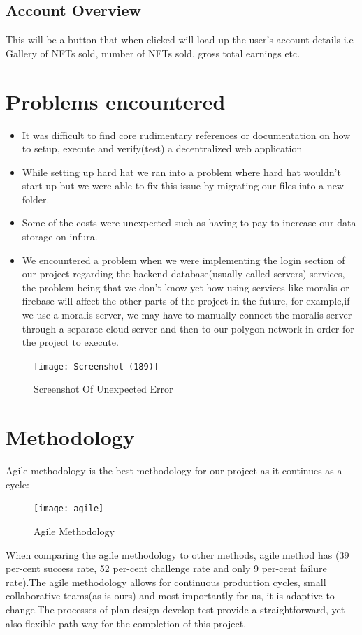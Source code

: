\documentclass[a4paper,12pt]{article}
\begin{document}
\subsection{Account Overview}
This will be a button that when clicked will load up the user's account details i.e Gallery of NFTs sold, number of NFTs sold, gross total earnings etc.


\section{Problems encountered}
\begin{itemize}
\item It was difficult to find core rudimentary references or documentation on how to setup, execute and verify(test) a decentralized web application
\item While setting up hard hat we ran into a problem where hard hat wouldn't start up but we were able to fix this issue by migrating our files into a new folder.
\item Some of the  costs were unexpected such as having to pay to increase our data storage on infura.
\item We encountered a problem when we were implementing the login section of our project regarding the backend database(usually called servers) services, the problem being that we don't know yet how using services like moralis or firebase will affect the other parts of the project in the future, for example,if we use a moralis server, we may have to manually connect the moralis server through a separate cloud server and then to our polygon network in order for the project to execute.

\end{itemize}
\begin{figure}[h]
\centering
\texttt{[image: Screenshot (189)]}
\caption{Screenshot Of Unexpected Error}
\end{figure}

\newpage


\section{Methodology}
Agile methodology is the best methodology for our project as it continues as a cycle:
\begin{figure}[h]
\centering
\texttt{[image: agile]}
\caption{Agile Methodology}
\end{figure}
\vspace{1cm}
When comparing the agile methodology to other methods, agile method has (39 per-cent success rate, 52 per-cent challenge rate and only 9 per-cent failure rate).The agile methodology allows for continuous production cycles, small collaborative teams(as is ours) and most importantly for us, it is adaptive to change.The processes of plan-design-develop-test provide a straightforward, yet also flexible path way for the completion of this project.
\end{document}
